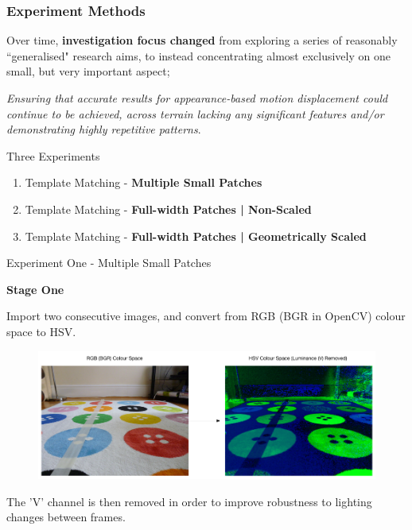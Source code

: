 \documentclass[10pt, compress]{beamer}
\begin{document}
\begin{frame}[fragile]
  \frametitle{Experiment Methods}
  
  {\normalsize Over time, \textbf{investigation focus changed} from exploring a series of reasonably ``generalised" research aims, to instead concentrating almost exclusively on one small, but very important aspect; 
  \vspace{-10pt}
  
  \begin{block}{}
  \textit{Ensuring that accurate results for appearance-based motion displacement could continue to be achieved, across terrain lacking any significant features and/or demonstrating highly repetitive patterns}.
  \end{block}}
		
  \begin{block}{Three Experiments}
  \begin{enumerate}[label={\arabic*.}]
  	  
  \item Template Matching - \textbf{Multiple Small Patches}

  \item Template Matching - \textbf{Full-width Patches | Non-Scaled}
  
  \item Template Matching - \textbf{Full-width Patches | Geometrically Scaled}
 
\end{enumerate}
\end{block}

\end{frame}

\begin{frame}{Experiment One - Multiple Small Patches}


\textbf{Stage One} \\ \vspace{0.2cm}

Import two consecutive images, and convert from RGB (BGR in OpenCV) colour space to HSV.

\begin{figure}[ht!]
\centering
\includegraphics[scale=0.26]{rgb2hsv.png}
  \end{figure}
  
The 'V' channel is then removed in order to improve robustness to lighting changes between frames. 
\end{frame}
\end{document}
